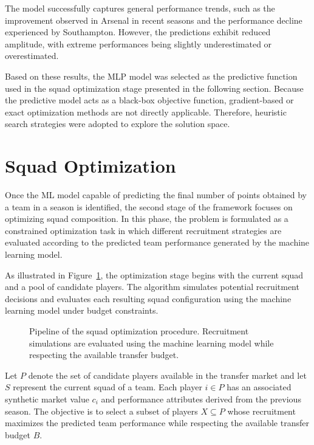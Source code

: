\documentclass[12pt]{article}
\begin{document}
The model successfully captures general performance trends, such as the improvement observed in Arsenal in recent seasons and the performance decline
experienced by Southampton. However, the predictions exhibit reduced amplitude, with extreme performances being slightly underestimated or overestimated.

Based on these results, the MLP model was selected as the predictive function used in the squad optimization stage presented in the following section.
Because the predictive model acts as a black-box objective function, gradient-based or exact optimization methods are not directly applicable. 
Therefore, heuristic search strategies were adopted to explore the solution space.

\section{Squad Optimization}

Once the ML model capable of predicting the final number of points obtained by a team in a season is identified, the second stage of the framework
focuses on optimizing squad composition. In this phase, the problem is formulated as a constrained optimization task in which different recruitment strategies are
evaluated according to the predicted team performance generated by the machine learning model.

As illustrated in Figure~\ref{fig:optimization_pipeline}, the optimization stage begins with the current squad and a pool of candidate players. 
The algorithm simulates potential recruitment decisions and evaluates each resulting squad configuration using the machine learning model under 
budget constraints.

\begin{figure}[htbp]
\centering

\caption{Pipeline of the squad optimization procedure. Recruitment simulations are evaluated using the machine learning model while respecting the available transfer budget.}
\label{fig:optimization_pipeline}
\end{figure}

Let $P$ denote the set of candidate players available in the transfer market and let $S$ represent the current squad of a team. 
Each player $i \in P$ has an associated synthetic market value $c_i$ and performance attributes derived from the previous season. 
The objective is to select a subset of players $X \subseteq P$ whose recruitment maximizes the predicted team performance while 
respecting the available transfer budget $B$.
\end{document}
